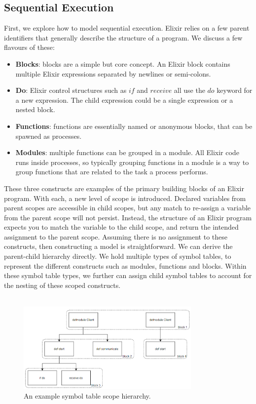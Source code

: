 \subsection{Sequential Execution} \label{sec:sequential_execution}
First, we explore how to model sequential execution. Elixir relies on a few parent identifiers that generally describe the structure of a program. We discuss a few flavours of these:
\begin{itemize}
    \item \textbf{Blocks}: blocks are a simple but core concept. An Elixir block contains multiple Elixir expressions separated by newlines or semi-colons.
    \item \textbf{Do}: Elixir control structures such as $if$ and $receive$ all use the $do$ keyword for a new expression. The child expression could be a single expression or a nested block.
    \item \textbf{Functions}: functions are essentially named or anonymous blocks, that can be spawned as processes.
    \item \textbf{Modules}: multiple functions can be grouped in a module. All Elixir code runs inside processes, so typically grouping functions in a module is a way to group functions that are related to the task a process performs.
\end{itemize}
These three constructs are examples of the primary building blocks of an Elixir program. With each, a new level of scope is introduced. Declared variables from parent scopes are accessible in child scopes, but any match to re-assign a variable from the parent scope will not persist. Instead, the structure of an Elixir program expects you to match the variable to the child scope, and return the intended assignment to the parent scope. Assuming there is no assignment to these constructs, then constructing a model is straightforward. We can derive the parent-child hierarchy directly. We hold multiple types of symbol tables, to represent the different constructs such as modules, functions and blocks. Within these symbol table types, we further can assign child symbol tables to account for the nesting of these scoped constructs.
\\ \\
\begin{figure}[h]
    \centering
    \includegraphics[width=0.8\textwidth]{images/sym_Table.png}
    \caption{An example symbol table scope hierarchy.}
    \label{fig:scope_hierarchy}
\end{figure}
\\ \\
